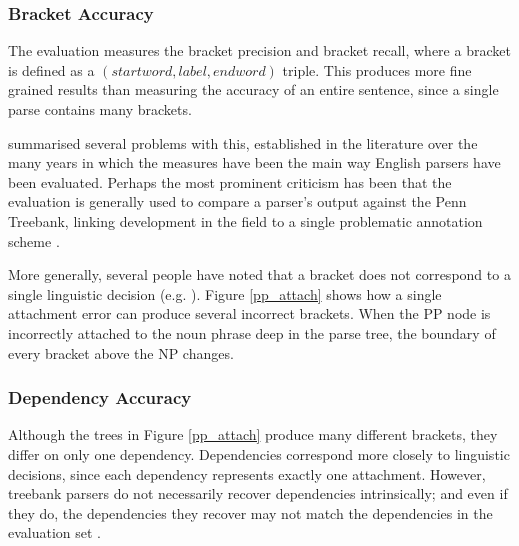

\subsubsection{Bracket Accuracy}

The \parseval evaluation \citep{black91} measures the bracket precision and bracket recall, where a bracket is defined as a $(start word, label, end word)$ triple. This produces more fine grained results than measuring the accuracy of an entire sentence, since a single parse contains many brackets.

\citep{carroll02} summarised several problems with this, established in the literature over the many years in which the \parseval measures have been the main way English parsers have been evaluated. Perhaps the most prominent criticism has been that the evaluation is generally used to compare a parser's output against the Penn Treebank, linking development in the field to a single problematic annotation scheme \citep{beyond_parseval}.

More generally, several people have noted that a bracket does not correspond to a single linguistic decision (e.g. \citep{lin96}). Figure \ref{pp_attach} shows how a single attachment error can produce several incorrect brackets. When the PP node is incorrectly attached to the noun phrase deep in the parse tree, the boundary of every bracket above the NP changes.

\subsubsection{\ccg Dependency Accuracy}

Although the trees in Figure \ref{pp_attach} produce many different brackets, they differ on only one dependency. Dependencies correspond more closely to linguistic decisions, since each dependency represents exactly one attachment. However, treebank parsers do not necessarily recover dependencies intrinsically; and even if they do, the dependencies they recover may not match the dependencies in the evaluation set \cn.

